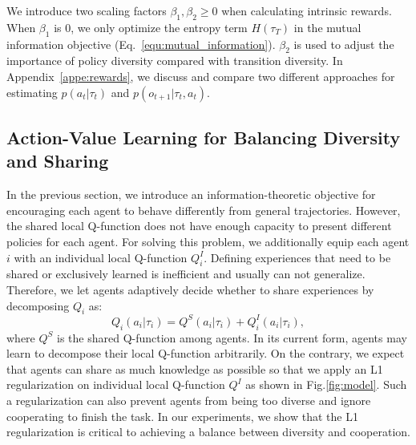 We introduce two scaling factors $\beta_1,\beta_2 \geq 0$ when calculating intrinsic rewards. When $\beta_1$ is 0, we only optimize the entropy term $H(\tau_T)$ in the mutual information objective (Eq.~\ref{equ:mutual_information}). $\beta_2$ is used to adjust the importance of policy diversity compared with transition diversity. In Appendix~\ref{appe:rewards}, we discuss and compare two different approaches for estimating $p\left(a_{t} | \tau_{t}\right)$ and $p\left(o_{t+1} | \tau_{t}, a_{t}\right)$.


\subsection{Action-Value Learning for Balancing Diversity and Sharing}\label{sec:represent}
In the previous section, we introduce an information-theoretic objective for encouraging each agent to behave differently from general trajectories. However, the shared local Q-function does not have enough capacity to present different policies for each agent. For solving this problem, we additionally equip each agent $i$ with an individual local Q-function $Q^I_i$. Defining experiences that need to be shared or exclusively learned is inefficient and usually can not generalize. Therefore, we let agents adaptively decide whether to share experiences by decomposing $Q_i$ as:
\begin{equation}
    Q_i(a_i | \tau_i) = Q^S(a_i | \tau_i) + Q^I_i(a_i | \tau_i),
\end{equation}
where $Q^S$ is the shared Q-function among agents. In its current form, agents may learn to decompose their local Q-function arbitrarily. On the contrary, we expect that agents can share as much knowledge as possible so that we apply an L1 regularization on individual local Q-function $Q^I$ as shown in Fig.\ref{fig:model}. Such a regularization can also prevent agents from being too diverse and ignore cooperating to finish the task. In our experiments, we show that the L1 regularization is critical to achieving a balance between diversity and cooperation.

